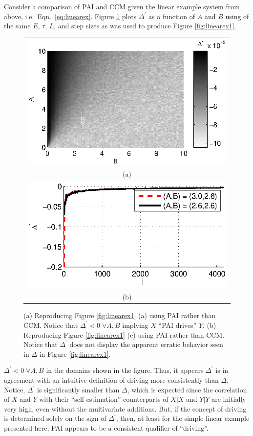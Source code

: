 \documentclass[twocolumn,aps,pre,groupedaddress]{revtex4-1}
\begin{document}
Consider a comparison of PAI and CCM given the linear example system from above, i.e.\ Eqn.\ \ref{eq:linearex}.  Figure \ref{fig:linearExPAI} plots $\Delta^\prime$ as a function of $A$ and $B$ using of the same $E$, $\tau$, $L$, and step sizes as was used to produce Figure \ref{fig:linearex1}.
\begin{figure}[ht]
\begin{tabular}{c}
\includegraphics[scale=0.9]{LinearExPAI.eps} \\
(a) \\
\includegraphics[scale=0.9]{LinearExPAIChangeL.eps} \\
(b) \\
\end{tabular}
\caption{(a) Reproducing Figure \ref{fig:linearex1} (a) using PAI rather than CCM.  Notice that $\Delta^\prime<0\;\forall A,B$ implying $X$ ``PAI drives'' $Y$. (b) Reproducing Figure \ref{fig:linearex1} (c) using PAI rather than CCM.  Notice that $\Delta^\prime$ does not display the apparent erratic behavior seen in $\Delta$ in Figure \ref{fig:linearex1}.}
\label{fig:linearExPAI}
\end{figure}
$\Delta^\prime<0\;\forall A,B$ in the domains shown in the figure.  Thus, it appears $\Delta^\prime$ is in agreement with an intuitive definition of driving more consistently than $\Delta$.  Notice, $\Delta^\prime$ is significantly smaller than $\Delta$, which is expected since the correlation of $X$ and $Y$ with their ``self estimation'' counterparts of $X|X$ and $Y|Y$ are initially very high, even without the multivariate additions.  But, if the concept of driving is determined solely on the sign of $\Delta^\prime$, then, at least for the simple linear example presented here, PAI appears to be a consistent qualifier of ``driving''.
\end{document}
